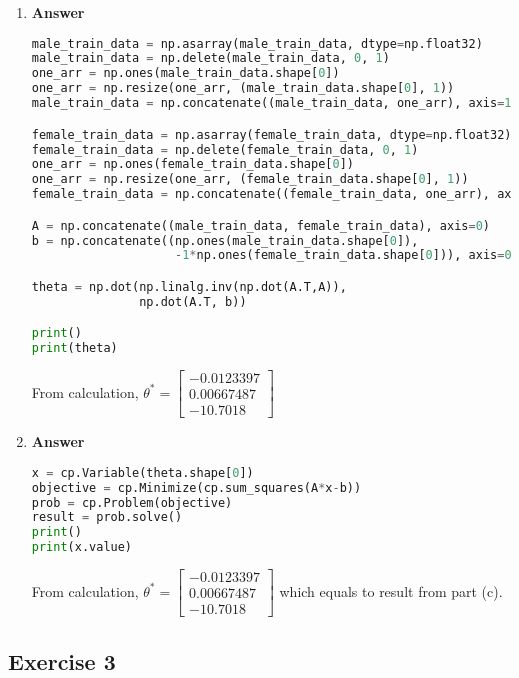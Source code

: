 \documentclass[11pt]{article}
\begin{document}
\begin{enumerate}[label=(\alph*)]
\item  \textbf{Answer}

\begin{lstlisting}[language=Python, showstringspaces=false]
male_train_data = np.asarray(male_train_data, dtype=np.float32)
male_train_data = np.delete(male_train_data, 0, 1)
one_arr = np.ones(male_train_data.shape[0])
one_arr = np.resize(one_arr, (male_train_data.shape[0], 1))
male_train_data = np.concatenate((male_train_data, one_arr), axis=1)

female_train_data = np.asarray(female_train_data, dtype=np.float32)
female_train_data = np.delete(female_train_data, 0, 1)
one_arr = np.ones(female_train_data.shape[0])
one_arr = np.resize(one_arr, (female_train_data.shape[0], 1))
female_train_data = np.concatenate((female_train_data, one_arr), axis=1)

A = np.concatenate((male_train_data, female_train_data), axis=0)
b = np.concatenate((np.ones(male_train_data.shape[0]), 
                    -1*np.ones(female_train_data.shape[0])), axis=0)

theta = np.dot(np.linalg.inv(np.dot(A.T,A)),
               np.dot(A.T, b))

print()
print(theta)
\end{lstlisting}

From calculation, $\theta^* = 
\begin{bmatrix}
-0.0123397 \\
0.00667487 \\
-10.7018
\end{bmatrix}$

\item  \textbf{Answer} 

\begin{lstlisting}[language=Python, showstringspaces=false]
x = cp.Variable(theta.shape[0])
objective = cp.Minimize(cp.sum_squares(A*x-b))
prob = cp.Problem(objective)
result = prob.solve()
print()
print(x.value)
\end{lstlisting}

From calculation, $\theta^* = 
\begin{bmatrix}
-0.0123397 \\
0.00667487 \\
-10.7018
\end{bmatrix}$ which equals to result from part (c).

\end{enumerate}

\subsection*{Exercise 3}
\end{document}
